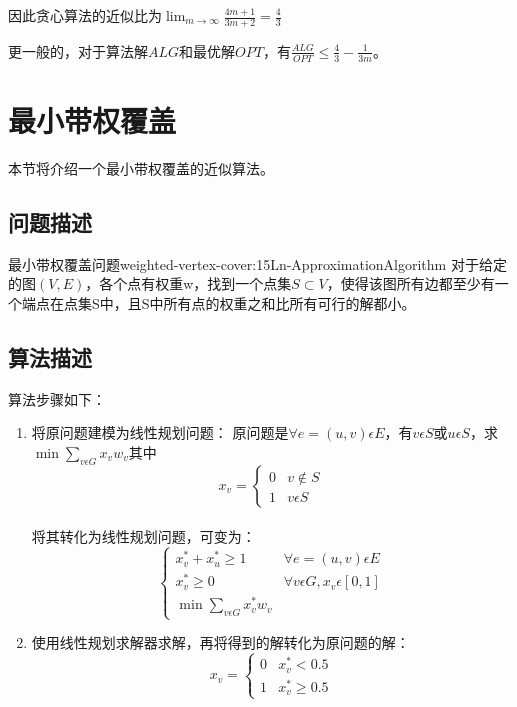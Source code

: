因此贪心算法的近似比为$\lim_{m\to \infty}\frac{4m+1}{3m+2}=\frac{4}{3}$

更一般的，对于算法解$ALG$和最优解$OPT$，有$\frac{ALG}{OPT} \leq \frac{4}{3}-\frac{1}{3m}$。



\section{最小带权覆盖}

本节将介绍一个最小带权覆盖的近似算法。

\subsection{问题描述}

\begin{definition}{最小带权覆盖问题}{weighted-vertex-cover:15Ln-ApproximationAlgorithm}
	对于给定的图$(V,E)$，各个点有权重w，找到一个点集$S\subset V$，使得该图所有边都至少有一个端点在点集S中，且S中所有点的权重之和比所有可行的解都小。
\end{definition}

\subsection{算法描述}

算法步骤如下：
\begin{enumerate}
	\item 将原问题建模为线性规划问题：
	原问题是$\forall e=(u,v)\epsilon E$，有$v\epsilon S$或$u\epsilon S$，求$\min \sum\limits_{v\epsilon G} x_vw_v$其中
	\[
		x_v = \begin{cases}
			0 & v\notin S \\
			1 & v\epsilon S
		\end{cases}
	\]\\
	将其转化为线性规划问题，可变为：
	\[
		\begin{cases}
			x_v^*+x_u^*\geqslant 1 			   &\forall e=(u,v)\epsilon E\\
			x_v^*\geqslant 0	   			   &\forall v\epsilon G, x_v\epsilon [0,1]\\
			\min \sum\limits_{v\epsilon G} x_v^*w_v
		\end{cases}
	\]
	\item 使用线性规划求解器求解，再将得到的解转化为原问题的解：
	\[
		x_v=\begin{cases}
			0 &x_v^*<0.5\\
			1 &x_v^*\geqslant 0.5
		\end{cases}
	\]
\end{enumerate}

